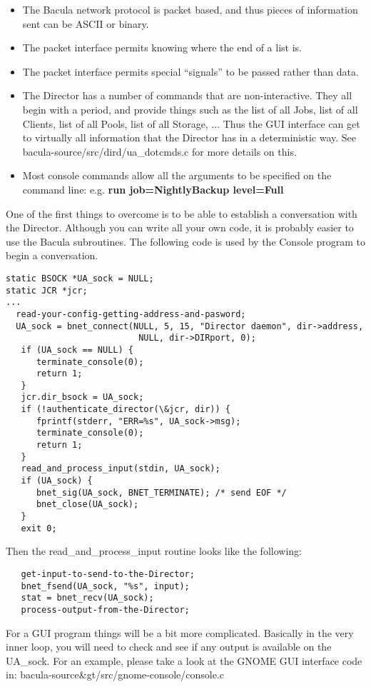 \begin{itemize}
\item The Bacula network protocol is packet based, and  thus pieces of
information sent can be ASCII or binary.  
\item The packet interface permits knowing where the end of  a list is.  
\item The packet interface permits special ``signals''  to be passed rather
than data.  
\item The Director has a number of commands that are  non-interactive. They
all begin with a period,  and provide things such as the list of all Jobs, 
list of all Clients, list of all Pools, list of  all Storage, ... Thus the GUI
interface can get  to virtually all information that the Director has  in a
deterministic way. See  \lt{}bacula-source\gt{}/src/dird/ua\_dotcmds.c for 
more details on this.  
\item Most console commands allow all the arguments to  be specified on the
command line: e.g.  {\bf run job=NightlyBackup level=Full} 
\end{itemize}

One of the first things to overcome is to be able to establish a conversation
with the Director. Although you can write all your own code, it is probably
easier to use the Bacula subroutines. The following code is used by the
Console program to begin a conversation. 

\footnotesize
\begin{verbatim}
static BSOCK *UA_sock = NULL;
static JCR *jcr;
...
  read-your-config-getting-address-and-pasword;
  UA_sock = bnet_connect(NULL, 5, 15, "Director daemon", dir->address,
                          NULL, dir->DIRport, 0);
   if (UA_sock == NULL) {
      terminate_console(0);
      return 1;
   }
   jcr.dir_bsock = UA_sock;
   if (!authenticate_director(\&jcr, dir)) {
      fprintf(stderr, "ERR=%s", UA_sock->msg);
      terminate_console(0);
      return 1;
   }
   read_and_process_input(stdin, UA_sock);
   if (UA_sock) {
      bnet_sig(UA_sock, BNET_TERMINATE); /* send EOF */
      bnet_close(UA_sock);
   }
   exit 0;
\end{verbatim}
\normalsize

Then the read\_and\_process\_input routine looks like the following: 

\footnotesize
\begin{verbatim}
   get-input-to-send-to-the-Director;
   bnet_fsend(UA_sock, "%s", input);
   stat = bnet_recv(UA_sock);
   process-output-from-the-Director;
\end{verbatim}
\normalsize

For a GUI program things will be a bit more complicated. Basically in the very
inner loop, you will need to check and see if any output is available on the
UA\_sock. For an example, please take a look at the GNOME GUI interface code
in: \lt{}bacula-source\&gt/src/gnome-console/console.c 
